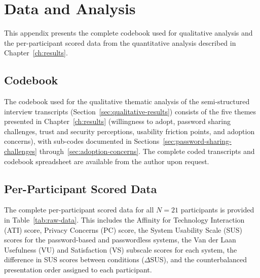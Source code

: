 \chapter{Data and Analysis}
\label{ap:data}

This appendix presents the complete codebook used for qualitative analysis and the per-participant scored data from the quantitative analysis described in Chapter~\ref{ch:results}.

\section{Codebook}
\label{sec:codebook}

The codebook used for the qualitative thematic analysis of the semi-structured interview transcripts (Section~\ref{sec:qualitative-results}) consists of the five themes presented in Chapter~\ref{ch:results} (willingness to adopt, password sharing challenges, trust and security perceptions, usability friction points, and adoption concerns), with sub-codes documented in Sections~\ref{sec:password-sharing-challenges} through~\ref{sec:adoption-concerns}. The complete coded transcripts and codebook spreadsheet are available from the author upon request.

\section{Per-Participant Scored Data}
\label{sec:per-participant-data}

The complete per-participant scored data for all $N = 21$ participants is provided in Table~\ref{tab:raw-data}. This includes the Affinity for Technology Interaction (ATI) score, Privacy Concerns (PC) score, the System Usability Scale (SUS) scores for the password-based and passwordless systems, the Van der Laan Usefulness (VU) and Satisfaction (VS) subscale scores for each system, the difference in SUS scores between conditions ($\Delta$SUS), and the counterbalanced presentation order assigned to each participant.


